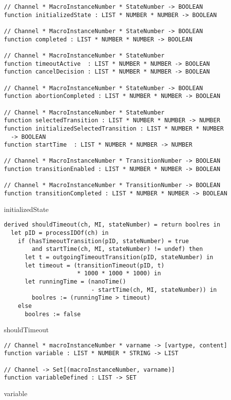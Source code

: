 \begin{listing}[H]
\begin{verbatim}
// Channel * MacroInstanceNumber * StateNumber -> BOOLEAN
function initializedState : LIST * NUMBER * NUMBER -> BOOLEAN

// Channel * MacroInstanceNumber * StateNumber -> BOOLEAN
function completed : LIST * NUMBER * NUMBER -> BOOLEAN

// Channel * MacroInstanceNumber * StateNumber
function timeoutActive  : LIST * NUMBER * NUMBER -> BOOLEAN
function cancelDecision : LIST * NUMBER * NUMBER -> BOOLEAN

// Channel * MacroInstanceNumber * StateNumber -> BOOLEAN
function abortionCompleted : LIST * NUMBER * NUMBER -> BOOLEAN

// Channel * MacroInstanceNumber * StateNumber
function selectedTransition : LIST * NUMBER * NUMBER -> NUMBER
function initializedSelectedTransition : LIST * NUMBER * NUMBER
  -> BOOLEAN
function startTime  : LIST * NUMBER * NUMBER -> NUMBER

// Channel * MacroInstanceNumber * TransitionNumber -> BOOLEAN
function transitionEnabled : LIST * NUMBER * NUMBER -> BOOLEAN

// Channel * MacroInstanceNumber * TransitionNumber -> BOOLEAN
function transitionCompleted : LIST * NUMBER * NUMBER -> BOOLEAN
\end{verbatim}
\caption{initializedState}
\label{lst:asm:initializedState}
\end{listing}



\begin{listing}[H]
\begin{verbatim}
derived shouldTimeout(ch, MI, stateNumber) = return boolres in
  let pID = processIDOf(ch) in
    if (hasTimeoutTransition(pID, stateNumber) = true
        and startTime(ch, MI, stateNumber) != undef) then
      let t = outgoingTimeoutTransition(pID, stateNumber) in
      let timeout = (transitionTimeout(pID, t)
                     * 1000 * 1000 * 1000) in
      let runningTime = (nanoTime()
                         - startTime(ch, MI, stateNumber)) in
        boolres := (runningTime > timeout)
    else
      boolres := false
\end{verbatim}
\caption{shouldTimeout}
\label{lst:asm:shouldTimeout}
\end{listing}


\begin{listing}[H]
\begin{verbatim}
// Channel * macroInstanceNumber * varname -> [vartype, content]
function variable : LIST * NUMBER * STRING -> LIST

// Channel -> Set[(macroInstanceNumber, varname)]
function variableDefined : LIST -> SET
\end{verbatim}
\caption{variable}
\label{lst:asm:variable}
\end{listing}


